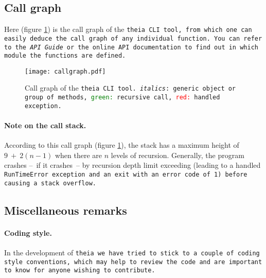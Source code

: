 \documentclass{article}
\begin{document}
\subsection{Call graph}
Here (figure \ref{callgraph}) is the call graph of the \tt{theia} CLI tool, from which one can easily deduce the call graph of any individual function. You can refer to the \textit{API Guide} or the online API documentation to find out in which module the functions are defined.


\begin{figure}[h]
\begin{center}
\texttt{[image: callgraph.pdf]}
\end{center}
\caption{Call graph of the \tt{theia} CLI tool. \textit{italics}: generic object or group of methods, \textcolor{green}{green:} recursive call, \textcolor{red}{red:} handled exception.}
\label{callgraph}
\end{figure}



\paragraph{Note on the  call stack.}According to this call graph (figure \ref{callgraph}), the stack has a maximum height of $9~+~2(n-1)$ when there are $n$ levels of recursion. Generally, the program crashes --~if it crashes~-- by recursion depth limit exceeding (leading to a handled \tt{RunTimeError} exception and an exit with an error code of 1) before causing a stack overflow.

\subsection{Miscellaneous remarks}

\paragraph{Coding style.}In the development of \tt{theia} we have tried to stick to a couple of coding style conventions, which may help to review the code and are important to know for anyone wishing to contribute.
\end{document}
